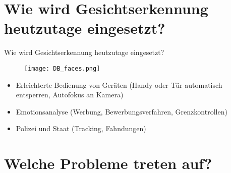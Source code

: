 \documentclass[10pt]{beamer}
\begin{document}
%

\section{Wie wird Gesichtserkennung heutzutage eingesetzt?}

\begin{frame}{Wie wird Gesichtserkennung heutzutage eingesetzt?}
  \begin{figure}
    \texttt{[image: DB\_faces.png]}
  \end{figure}
  \begin{itemize}
    \item Erleichterte Bedienung von Geräten (Handy oder Tür automatisch entsperren, Autofokus an Kamera)
    \item Emotionsanalyse (Werbung, Bewerbungsverfahren, Grenzkontrollen\cite{NatureEmotions})
    \item Polizei und Staat (Tracking, Fahndungen)
  \end{itemize}
\end{frame}

\section{Welche Probleme treten auf?}
\end{document}
